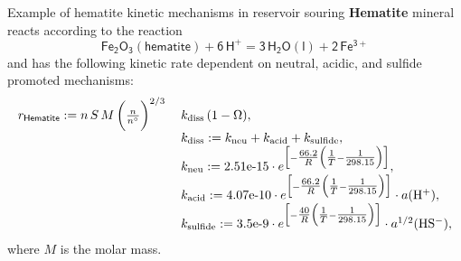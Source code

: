 %	
%	
%
%
\begin{frame}[fragile]{Example of hematite kinetic mechanisms in reservoir souring}
	\small
\alert{\bf Hematite} mineral reacts according to the reaction 
	\[\mathsf{Fe_{2}O_{3}(hematite)+6\,H^{+}=3\,H_{2}O(l)+2\,Fe^{3+}}\]
	and has the following kinetic rate dependent on neutral, acidic, and sulfide promoted mechanisms:
	\[
	\begin{array}{ll}
		r_{\sf Hematite}:=n \,S\,M\,\bigg(\frac{n}{n^\circ}\bigg)^{2/3}\: & k_{\rm diss}\,(1-\ensuremath{\Omega}), \\
		&  k_{\rm diss}:=k_{\rm neu}+k_{\rm acid}+k_{\rm sulfide},\\
		& k_{\rm neu}:=\mbox{2.51e-15}\cdot e^{\Big[-\tfrac{66.2}{R}\Big(\tfrac{1}{T}-\tfrac{1}{298.15}\Big)\Big]},\\
		& k_{\rm acid}:=\mbox{4.07e-10}\cdot e^{\Big[-\tfrac{66.2}{R}\Big(\tfrac{1}{T}-\tfrac{1}{298.15}\Big)\Big]}\cdot a({\rm H^{+}}),\\
		& k_{\rm sulfide}:=\mbox{3.5e-9}\cdot e^{\Big[-\tfrac{40}{R}\Big(\tfrac{1}{T}-\tfrac{1}{298.15}\Big)\Big]}\cdot a^{1/2}({\rm HS^{-}}),
	\end{array}
	\]
	where $M$ is the molar mass.
\end{frame}

